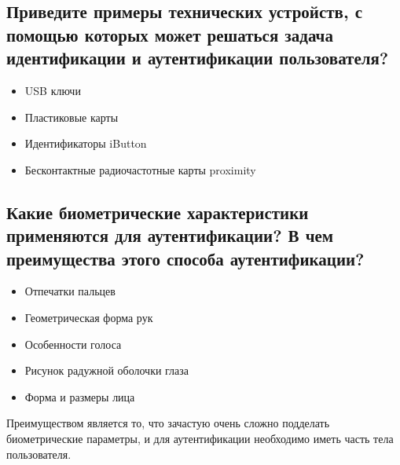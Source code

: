 \subsection{Приведите примеры технических устройств, с помощью
  которых может решаться задача идентификации и аутентификации
  пользователя?}

  \begin{itemize}
    \item USB ключи
    \item Пластиковые карты
    \item Идентификаторы iButton
    \item Бесконтактные радиочастотные карты proximity
  \end{itemize}

\subsection{Какие биометрические характеристики применяются для
  аутентификации? В чем преимущества этого способа 
  аутентификации?}

  \begin{itemize}
    \item Отпечатки пальцев
    \item Геометрическая форма рук
    \item Особенности голоса
    \item Рисунок радужной оболочки глаза
    \item Форма и размеры лица
  \end{itemize}

  Преимуществом является то, что зачастую очень сложно подделать биометрические
  параметры, и для аутентификации необходимо иметь часть тела пользователя.

